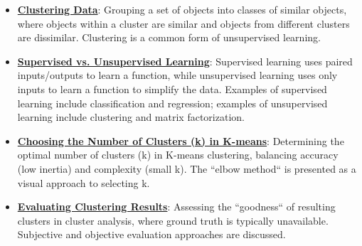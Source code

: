 \documentclass{article}%
\begin{document}
\begin{itemize}[leftmargin=*]%
\item \href{https://purdue.brightspace.com/d2l/common/assets/pdfjs-d2l-dist/1.0.14-legacy/web/viewer.html?file=\%2Fcontent\%2Fenforced\%2F1095467-wl.202510.CS.24300.001\%2F12L2-distance-clusters.pdf\%3Fou\%3D1095467\&lang=en-us\&container=d2l-fileviewer-rendered-pdf\&fullscreen=d2l-fileviewer-rendered-pdf-dialog\&height=667#page=4}{\textbf{Clustering Data}}: Grouping a set of objects into classes of similar objects, where objects within a cluster are similar and objects from different clusters are dissimilar. Clustering is a common form of unsupervised learning.%
\item \href{https://purdue.brightspace.com/d2l/common/assets/pdfjs-d2l-dist/1.0.14-legacy/web/viewer.html?file=\%2Fcontent\%2Fenforced\%2F1095467-wl.202510.CS.24300.001\%2F12L2-distance-clusters.pdf\%3Fou\%3D1095467\&lang=en-us\&container=d2l-fileviewer-rendered-pdf\&fullscreen=d2l-fileviewer-rendered-pdf-dialog\&height=667#page=3}{\textbf{Supervised vs. Unsupervised Learning}}: Supervised learning uses paired inputs/outputs to learn a function, while unsupervised learning uses only inputs to learn a function to simplify the data. Examples of supervised learning include classification and regression; examples of unsupervised learning include clustering and matrix factorization.%
\item \href{https://purdue.brightspace.com/d2l/common/assets/pdfjs-d2l-dist/1.0.14-legacy/web/viewer.html?file=\%2Fcontent\%2Fenforced\%2F1095467-wl.202510.CS.24300.001\%2F12L2-distance-clusters.pdf\%3Fou\%3D1095467\&lang=en-us\&container=d2l-fileviewer-rendered-pdf\&fullscreen=d2l-fileviewer-rendered-pdf-dialog\&height=667#page=33}{\textbf{Choosing the Number of Clusters (k) in K{-}means}}: Determining the optimal number of clusters (k) in K-means clustering, balancing accuracy (low inertia) and complexity (small k). The ``elbow method`` is presented as a visual approach to selecting k.%
\item \href{https://purdue.brightspace.com/d2l/common/assets/pdfjs-d2l-dist/1.0.14-legacy/web/viewer.html?file=\%2Fcontent\%2Fenforced\%2F1095467-wl.202510.CS.24300.001\%2F12L2-distance-clusters.pdf\%3Fou\%3D1095467\&lang=en-us\&container=d2l-fileviewer-rendered-pdf\&fullscreen=d2l-fileviewer-rendered-pdf-dialog\&height=667#page=37}{\textbf{Evaluating Clustering Results}}: Assessing the ``goodness`` of resulting clusters in cluster analysis, where ground truth is typically unavailable. Subjective and objective evaluation approaches are discussed.%

\end{itemize}
\end{document}
